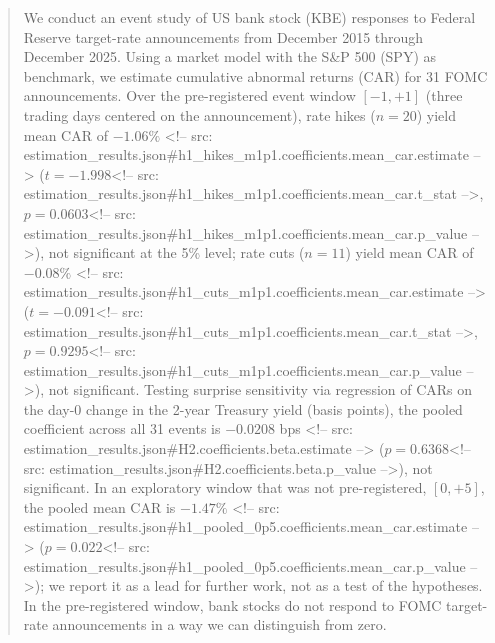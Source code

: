 \begin{abstract}

We conduct an event study of US bank stock (KBE) responses to Federal Reserve target-rate announcements from December 2015 through December 2025. Using a market model with the S\&P 500 (SPY) as benchmark, we estimate cumulative abnormal returns (CAR) for 31 FOMC announcements. Over the pre-registered event window $[-1, +1]$ (three trading days centered on the announcement), rate hikes ($n=20$) yield mean CAR of $-1.06\%$ <!-- src: estimation_results.json#h1_hikes_m1p1.coefficients.mean_car.estimate --> ($t = -1.998$<!-- src: estimation_results.json#h1_hikes_m1p1.coefficients.mean_car.t_stat -->, $p = 0.0603$<!-- src: estimation_results.json#h1_hikes_m1p1.coefficients.mean_car.p_value -->), not significant at the 5\% level; rate cuts ($n=11$) yield mean CAR of $-0.08\%$ <!-- src: estimation_results.json#h1_cuts_m1p1.coefficients.mean_car.estimate --> ($t = -0.091$<!-- src: estimation_results.json#h1_cuts_m1p1.coefficients.mean_car.t_stat -->, $p = 0.9295$<!-- src: estimation_results.json#h1_cuts_m1p1.coefficients.mean_car.p_value -->), not significant. Testing surprise sensitivity via regression of CARs on the day-0 change in the 2-year Treasury yield (basis points), the pooled coefficient across all 31 events is $-0.0208$ bps <!-- src: estimation_results.json#H2.coefficients.beta.estimate --> ($p = 0.6368$<!-- src: estimation_results.json#H2.coefficients.beta.p_value -->), not significant. In an exploratory window that was not pre-registered, $[0, +5]$, the pooled mean CAR is $-1.47\%$ <!-- src: estimation_results.json#h1_pooled_0p5.coefficients.mean_car.estimate --> ($p = 0.022$<!-- src: estimation_results.json#h1_pooled_0p5.coefficients.mean_car.p_value -->); we report it as a lead for further work, not as a test of the hypotheses. In the pre-registered window, bank stocks do not respond to FOMC target-rate announcements in a way we can distinguish from zero.

\end{abstract}
